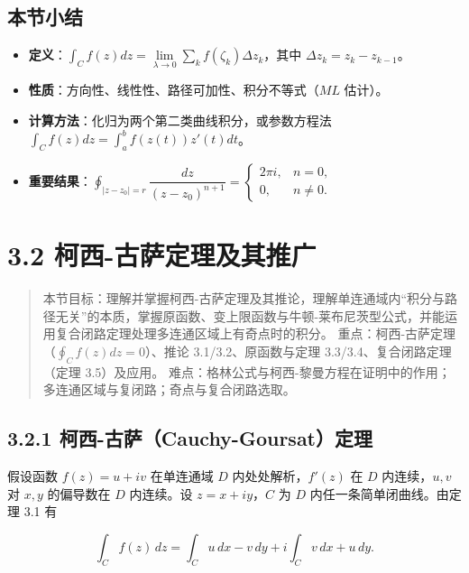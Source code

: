 \subsection{本节小结}\label{ux672cux8282ux5c0fux7ed3-7}

\begin{itemize}
\tightlist
\item
  \textbf{定义}：\(\int_C f(z)dz=\lim\limits_{\lambda\to0}\sum_{k}f(\zeta_k)\Delta z_k\)，其中
  \(\Delta z_k=z_k-z_{k-1}\)。
\item
  \textbf{性质}：方向性、线性性、路径可加性、积分不等式（\(ML\) 估计）。
\item
  \textbf{计算方法}：化归为两个第二类曲线积分，或参数方程法
  \(\int_C f(z)dz=\int_a^b f(z(t))z'(t)dt\)。
\item
  \textbf{重要结果}：\(\oint_{|z-z_0|=r}\dfrac{dz}{(z-z_0)^{n+1}}=\begin{cases}2\pi i,& n=0,\\0,& n\ne0.\end{cases}\)
\end{itemize}

\section{3.2
柯西-古萨定理及其推广}\label{ux67efux897f-ux53e4ux8428ux5b9aux7406ux53caux5176ux63a8ux5e7f}

\begin{quote}
本节目标：理解并掌握柯西-古萨定理及其推论，理解单连通域内``积分与路径无关''的本质，掌握原函数、变上限函数与牛顿-莱布尼茨型公式，并能运用复合闭路定理处理多连通区域上有奇点时的积分。
重点：柯西-古萨定理（\(\oint_C f(z)dz=0\)）、推论 3.1/3.2、原函数与定理
3.3/3.4、复合闭路定理（定理 3.5）及应用。
难点：格林公式与柯西-黎曼方程在证明中的作用；多连通区域与复闭路；奇点与复合闭路选取。
\end{quote}

\subsection{3.2.1
柯西-古萨（Cauchy-Goursat）定理}\label{ux67efux897f-ux53e4ux8428cauchy-goursatux5b9aux7406}

假设函数 \(f(z)=u+iv\) 在单连通域 \(D\) 内处处解析，\(f'(z)\) 在 \(D\)
内连续，\(u,v\) 对 \(x,y\) 的偏导数在 \(D\) 内连续。设 \(z=x+iy\)，\(C\)
为 \(D\) 内任一条简单闭曲线。由定理 3.1 有

\[
\int_C f(z)\,dz=\int_C u\,dx-v\,dy+i\int_C v\,dx+u\,dy .
\]

